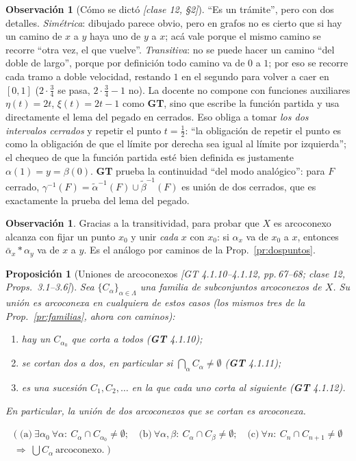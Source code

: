 \documentclass[11pt,a4paper]{article}
\newcommand{\lgc}[1]{\par\vspace{-3pt}\begin{gather*}\big(\;#1\;\big)\end{gather*}\vspace{-6pt}}
\theoremstyle{definition}
\newtheorem{observacion}[definicion]{Observación}
\theoremstyle{plain}
\newtheorem{proposicion}[definicion]{Proposición}
\newcommand{\fnt}[1]{{\normalfont\small\itshape\color{gray!150!black}[#1]}}
\begin{document}
\begin{observacion}[Cómo se dictó \fnt{clase 12, \S2}]
``Es un trámite'', pero con dos detalles. \emph{Simétrica}: dibujado parece obvio, pero en grafos no es cierto que si hay un camino de $x$ a $y$ haya uno de $y$ a $x$; acá vale porque el mismo camino se recorre ``otra vez, el que vuelve''. \emph{Transitiva}: no se puede hacer un camino ``del doble de largo'', porque por definición todo camino va de $0$ a $1$; por eso se recorre cada tramo a doble velocidad, restando $1$ en el segundo para volver a caer en $[0,1]$ ($2\cdot\frac34$ se pasa, $2\cdot\frac34-1$ no). La docente no compone con funciones auxiliares $\eta(t)=2t$, $\xi(t)=2t-1$ como \textbf{GT}, sino que escribe la función partida y usa directamente el lema del pegado en cerrados. Eso obliga a tomar \emph{los dos intervalos cerrados} y repetir el punto $t=\frac12$: ``la obligación de repetir el punto es como la obligación de que el límite por derecha sea igual al límite por izquierda''; el chequeo de que la función partida esté bien definida es justamente $\alpha(1)=y=\beta(0)$. \textbf{GT} prueba la continuidad ``del modo analógico'': para $F$ cerrado, $\gamma^{-1}(F)=\tilde\alpha^{-1}(F)\cup\tilde\beta^{-1}(F)$ es unión de dos cerrados, que es exactamente la prueba del lema del pegado.
\end{observacion}

\begin{observacion}
Gracias a la transitividad, para probar que $X$ es arcoconexo alcanza con fijar un punto $x_0$ y unir \emph{cada} $x$ con $x_0$: si $\alpha_x$ va de $x_0$ a $x$, entonces $\bar\alpha_x*\alpha_y$ va de $x$ a $y$. Es el análogo por caminos de la Prop.~\ref{pr:dospuntos}.
\end{observacion}

\begin{proposicion}[Uniones de arcoconexos \fnt{GT 4.1.10--4.1.12, pp.\,67--68; clase 12, Props.\ 3.1--3.6}]\label{cc:uniones}
Sea $\{C_\alpha\}_{\alpha\in\Lambda}$ una familia de subconjuntos arcoconexos de $X$. Su unión es arcoconexa en cualquiera de estos casos (los mismos tres de la Prop.~\ref{pr:familias}, ahora con caminos):
\begin{enumerate}[label=(\alph*),leftmargin=2.2em,itemsep=0pt]
\item hay un $C_{\alpha_0}$ que corta a todos (\textbf{GT} 4.1.10);
\item se cortan dos a dos, en particular si $\bigcap_\alpha C_\alpha\ne\emptyset$ (\textbf{GT} 4.1.11);
\item es una sucesión $C_1,C_2,\dots$ en la que cada uno corta al siguiente (\textbf{GT} 4.1.12).
\end{enumerate}
En particular, la unión de dos arcoconexos que se cortan es arcoconexa.
\lgc{\text{(a)}\ \exists\alpha_0\ \forall\alpha:\ C_\alpha\cap C_{\alpha_0}\ne\emptyset;\quad
\text{(b)}\ \forall\alpha,\beta:\ C_\alpha\cap C_\beta\ne\emptyset;\quad
\text{(c)}\ \forall n:\ C_n\cap C_{n+1}\ne\emptyset\\
\Longrightarrow\ \textstyle\bigcup C_\alpha\ \text{arcoconexo}.}
\end{proposicion}
\end{document}

